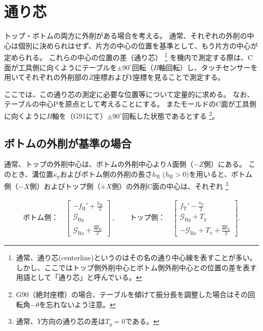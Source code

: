 \section{通り芯}
トップ・ボトムの両方に外削がある場合を考える。
通常、それぞれの外削の中心は個別に決められはせず、片方の中心の位置を基準として、もう片方の中心が定められる。
これらの中心の位置の差（通り芯）
\footnote{通常、通り芯(centerline)というのはその名の通り中心線を表すことが多い。
しかし、ここではトップ側外削中心とボトム側外削中心との位置の差を表す用語として「通り芯」と呼んでいる。}
を機内で測定する際は、C面が工具側に向くようにテーブルを$\pm90^\circ$回転（$B$軸回転）し、タッチセンサーを用いてそれぞれの外削部の$Z$座標および$Y$座標を見ることで測定する。

ここでは、この通り芯の測定に必要な位置等について定量的に求める。
なお、テーブルの中心Pを原点として考えることにする。
またモールドのC面が工具側に向くように$B$軸を（G91にて）$\pm90^\circ$回転した状態であるとする
\footnote{G90（絶対座標）の場合、テーブルを傾けて振分長を調整した場合はその回転角$-\theta$を忘れないよう注意。}。



\subsection{ボトムの外削が基準の場合}
通常、トップの外削中心は、ボトムの外削中心よりA面側（$-Z$側）にある。
このとき、溝位置$\kappa_p$およびボトム側の外削の長さ$h_\mathrm B$ ($h_\mathrm B > 0$)を用いると、ボトム側（$-X$側）およびトップ側（$+X$側）の外削C面の中心は、それぞれ%
\footnote{通常、$Y$方向の通り芯の差は$T_y=0$である。}

\begin{align*}
  \text{ボトム側：}\quad
  \left[
    \begin{array}{c}
      \displaystyle -f_\mathrm B'+\frac{h_\mathrm B}2\\[5pt]
      \mathcal G_{\mathrm By}\\[3pt]
      \displaystyle \mathcal G_{\mathrm Bx}+\frac{\mathfrak W_\mathrm B}2
    \end{array}
    \right]~, \qquad
  \text{トップ側：}\quad
  \left[
    \begin{array}{c}
      \displaystyle f_\mathrm T'-\frac{\kappa_p}2\\[5pt]
      \mathcal G_{\mathrm By}+T_y\\[3pt]
      \displaystyle -\mathcal G_{\mathrm Bx}+T_x+\frac{\mathfrak W_\mathrm T}2
    \end{array}
  \right].
\end{align*}



